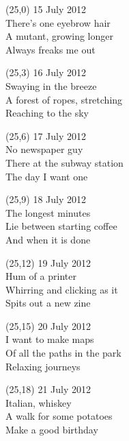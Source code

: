\documentclass[10pt]{article}
\begin{document}

\begin{textblock}{10}(25,0)
15 July 2012 \\
There's one eyebrow hair \\
A mutant, growing longer \\
Always freaks me out
\end{textblock}

\begin{textblock}{10}(25,3)
16 July 2012 \\
Swaying in the breeze \\
A forest of ropes, stretching \\
Reaching to the sky
\end{textblock}

\begin{textblock}{10}(25,6)
17 July 2012 \\
No newspaper guy \\
There at the subway station \\
The day I want one
\end{textblock}

\begin{textblock}{10}(25,9)
18 July 2012 \\
The longest minutes \\
Lie between starting coffee \\
And when it is done
\end{textblock}

\begin{textblock}{10}(25,12)
19 July 2012 \\
Hum of a printer \\
Whirring and clicking as it \\
Spits out a new zine
\end{textblock}

\begin{textblock}{10}(25,15)
20 July 2012 \\
I want to make maps \\
Of all the paths in the park \\
Relaxing journeys
\end{textblock}

\begin{textblock}{10}(25,18)
21 July 2012 \\
Italian, whiskey \\
A walk for some potatoes \\
Make a good birthday
\end{textblock}
\end{document}
